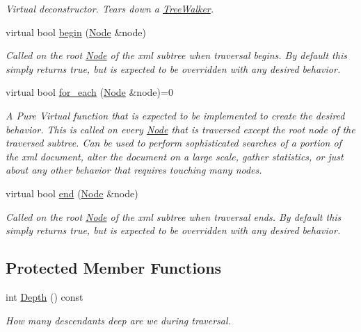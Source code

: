 \begin{DoxyCompactItemize}
\begin{DoxyCompactList}\small\item\em Virtual deconstructor. Tears down a \hyperlink{classphys_1_1xml_1_1TreeWalker}{TreeWalker}. \item\end{DoxyCompactList}\item 
virtual bool \hyperlink{classphys_1_1xml_1_1TreeWalker_a649d9e5a06542be0282d3d20994a62fc}{begin} (\hyperlink{classphys_1_1xml_1_1Node}{Node} \&node)
\begin{DoxyCompactList}\small\item\em Called on the root \hyperlink{classphys_1_1xml_1_1Node}{Node} of the xml subtree when traversal begins.  By default this simply returns true, but is expected to be overridden with any desired behavior. \item\end{DoxyCompactList}\item 
virtual bool \hyperlink{classphys_1_1xml_1_1TreeWalker_a03267e73acac44809f16739fd00a536d}{for\_\-each} (\hyperlink{classphys_1_1xml_1_1Node}{Node} \&node)=0
\begin{DoxyCompactList}\small\item\em A Pure Virtual function that is expected to be implemented to create the desired behavior.  This is called on every \hyperlink{classphys_1_1xml_1_1Node}{Node} that is traversed except the root node of the traversed subtree. Can be used to perform sophisticated searches of a portion of the xml document, alter the document on a large scale, gather statistics, or just about any other behavior that requires touching many nodes. \item\end{DoxyCompactList}\item 
virtual bool \hyperlink{classphys_1_1xml_1_1TreeWalker_a210f6d60579a152f89e651be797885b9}{end} (\hyperlink{classphys_1_1xml_1_1Node}{Node} \&node)
\begin{DoxyCompactList}\small\item\em Called on the root \hyperlink{classphys_1_1xml_1_1Node}{Node} of the xml subtree when traversal ends.  By default this simply returns true, but is expected to be overridden with any desired behavior. \item\end{DoxyCompactList}\end{DoxyCompactItemize}
\subsection*{Protected Member Functions}
\begin{DoxyCompactItemize}
\item 
int \hyperlink{classphys_1_1xml_1_1TreeWalker_a90fdd705ae4d5e8e3b931bb8896e4397}{Depth} () const 
\begin{DoxyCompactList}\small\item\em How many descendants deep are we during traversal. \item\end{DoxyCompactList}\end{DoxyCompactItemize}
